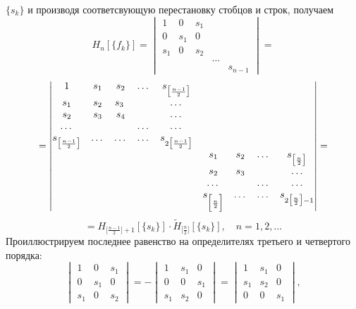 \documentclass[12pt,a4paper]{article}
\theoremstyle{plain}   \newtheorem{Pro}{Задача}
\begin{document}
$  \{ s_k \} $
и производя соответсвующую перестановку стобцов и строк,
получаем
\begin{equation*}
  H_n [\{ f_k \} ]=
    \begin{vmatrix}
	  1 & 0 & s_1 & \; & \; \\
	  0 & s_1 & 0 & \; & \; \\
	  s_1 & 0 & s_2 & \; & \; \\
	  \; & \; & \; & \dots & \; \\
	  \; & \; & \; & \; & s_{n-1}
	\end{vmatrix}
  =
\end{equation*}
\begin{equation*}
  =
    \begin{vmatrix}
	  1 & s_1 & s_2 & \dots &
	   s_{\bigl [ \frac{n-1}{2} \bigr ] } &
	    \; & \; & \; & \; \\
	  s_1 & s_2 & s_3 \; & \; & \dots &
	   \; & \; & \; & \; \\
	  s_2 & s_3 & s_4 & \; & \dots &
	   \; & \; & \; & \; \\
	   \dots & \; & \; & \dots & \dots &
	   \; & \; & \; & \; \\
	  s_{\bigl [ \frac{n-1}{2} \bigr ] } &
	   \dots & \dots & \dots & s_{2 \bigl [ \frac{n-1}{2} \bigr ] } &
	    \; & \; & \; & \; \\
	       \; & \; & \; & \; & \; &
		           s_1 & s_2 & \dots &
				      s_{\bigl [\frac{n}{2}\bigr ] } \\
		   \; & \; & \; & \; & \; &
		           s_2 & s_3 & \; & \dots \\
		   \; & \; & \; & \; & \; &
		           \dots & \; & \dots & \dots \\
		   \; & \; & \; & \; & \; &
		           s_{ \Bigl [\frac{n}{2} \Bigr ] }
				   & \dots & \dots &
				     s_{2 \bigl [ \frac{n}{2} \bigr ] -1 }
	 \end{vmatrix}
   =
\end{equation*}
\begin{equation*}
  = H_{\bigl [ \frac{n-1}{2} \bigr ] +1} [ \{ s_k \} ] \cdot
    \tilde H_{ \bigl [ \frac{n}{2} \bigr ] } [ \{ s_k \} ] ,
	  \quad n=1,2,...
\end{equation*}
Проиллюстрируем последнее равенство на определителях
третьего и четвертого порядка:
\begin{equation*}
  \begin{vmatrix}
    1 & 0 & s_1 \\
	0 & s_1 & 0 \\
	s_1 & 0 & s_2
  \end{vmatrix}
  =-
  \begin{vmatrix}
    1 & s_1 & 0 \\
	0 & 0 & s_1 \\
	s_1 & s_2 & 0
  \end{vmatrix}
  =
  \begin{vmatrix}
    1 & s_1 & 0 \\
	s_1 & s_2 & 0 \\
	0 & 0 & s_1
   \end{vmatrix}
   ,
\end{equation*}
\end{document}
